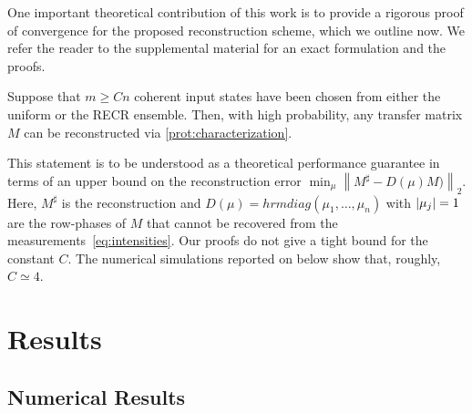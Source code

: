 
One important theoretical contribution of this work is to provide a rigorous proof of convergence for the proposed reconstruction scheme, which we outline now.
We refer the reader to the supplemental material for an exact formulation and the proofs.
\begin{theorem}%
  \label{thm:performance_guarantee}
  Suppose that $m \geq Cn$ coherent input states have been chosen from either the uniform or the RECR ensemble.
  Then, with high probability, any transfer matrix ${M}$ can be reconstructed via \cref{prot:characterization}.
\end{theorem}

This statement is to be understood as a theoretical performance guarantee in terms of an upper bound on the reconstruction error
\(
  \min_{{\mu}}\left\| {M}^\sharp -  {D} ({\mu}) {M}) \right\|_2.
\)
Here, ${M}^\sharp$ is the reconstruction and ${D}(\mu) = hrm{diag}(\mu_1, \ldots, \mu_n)$ with ${\vert\mu_j\vert} = 1$ are the row-phases of ${M}$ that cannot be  recovered from the measurements~\eqref{eq:intensities}.
Our proofs do not give a tight bound for the constant $C$.
The numerical simulations reported on below show that, roughly, $C\simeq 4$.




\section{Results}
\subsection{Numerical Results}

